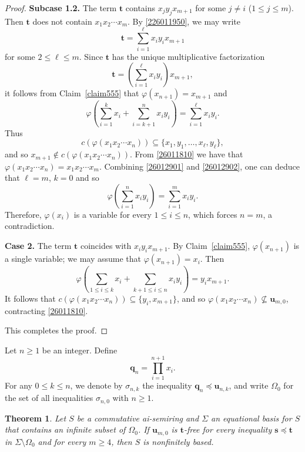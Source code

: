 \documentclass[reqno]{amsart}
\theoremstyle{plain}
\newtheorem{thm}{Theorem}[section]
\theoremstyle{definition}
\newcommand{\bq}{\mathbf{q}}
\newcommand{\bs}{\mathbf{s}}
\newcommand{\bt}{\mathbf{t}}
\newcommand{\bu}{\mathbf{u}}
\begin{document}
\begin{proof}
\textbf{Subcase 1.2.}
The term $\bt$ contains $x_jy_jx_{m+1}$ for some $j\neq i$ ($1\leq j \leq m$).
Then $\bt$ does not contain $x_1x_2\cdots x_m$.
By \eqref{226011950},
we may write
\[
\bt=\sum_{i=1}^\ell x_iy_ix_{m+1}
\]
for some $2\leq\ell\leq m$. Since $\bt$ has the unique multiplicative factorization
\[
\bt=\left(\sum_{i=1}^\ell x_iy_i\right)x_{m+1},
\]
it follows from Claim~\ref{claim555} that $\varphi(x_{n+1})=x_{m+1}$ and
\begin{equation}\label{26012901}
\varphi\left(\sum_{i=1}^kx_i+\sum_{i=k+1}^nx_iy_i\right)=\sum_{{i=1}}^\ell x_iy_i.
\end{equation}
Thus
\begin{equation}\label{26012902}
c(\varphi(x_1x_2\cdots x_n))\subseteq\{x_1, y_1,\dots, x_\ell, y_\ell\},
\end{equation}
and so $x_{m+1}\notin c(\varphi(x_1x_2\cdots x_n))$.
From \eqref{26011810} we have that $\varphi(x_1x_2\cdots x_n)=x_1x_2\cdots x_m$.
Combining \eqref{26012901} and \eqref{26012902},
one can deduce that $\ell=m$, $k=0$ and so
\[
\varphi\left(\sum_{i=1}^nx_iy_i\right)=\sum_{{i=1}}^m x_iy_i.
\]
Therefore, $\varphi(x_i)$ is a variable for every $1\leq i\leq n$, which forces $n=m$, a contradiction.


\textbf{Case 2.} The term $\bt$ coincides with $x_iy_ix_{m+1}$. By Claim~\ref{claim555}, $\varphi(x_{n+1})$ is a single variable;
we may assume that $\varphi(x_{n+1})=x_i$.
Then
\[
\varphi\left(\sum_{1\leq i\leq k}x_i+\sum_{k+1\leq i\leq n}x_iy_i\right)=y_ix_{m+1}.
\]
It follows that $c(\varphi(x_1x_2\cdots x_n))\subseteq\{y_i, x_{m+1}\}$,
and so $\varphi(x_1x_2\cdots x_n)\nsubseteq \bu_{m,0}$, contracting \eqref{26011810}.

This completes the proof.
\end{proof}

Let $n\geq 1$ be an integer. Define
\[
\bq_n=\prod_{i=1}^{n+1}x_i.
\]
For any $0\leq k \leq n$,
we denote by $\sigma_{n, k}$ the inequality $\bq_n \preceq \bu_{n, k}$,
and write $\Omega_0$ for the set of all inequalities $\sigma_{n, 0}$ with $n\geq 1$.

\begin{thm}\label{thm26012401}
Let $S$ be a commutative ai-semiring
and $\Sigma$ an equational basis for $S$ that contains an infinite subset of $\Omega_0$.
If $\bu_{m, 0}$ is $\bt$-free for every inequality $\bs\preceq\bt$ in $\Sigma\setminus \Omega_0$
and for every $m\geq 4$, then $S$ is nonfinitely based.
\end{thm}
\end{document}
